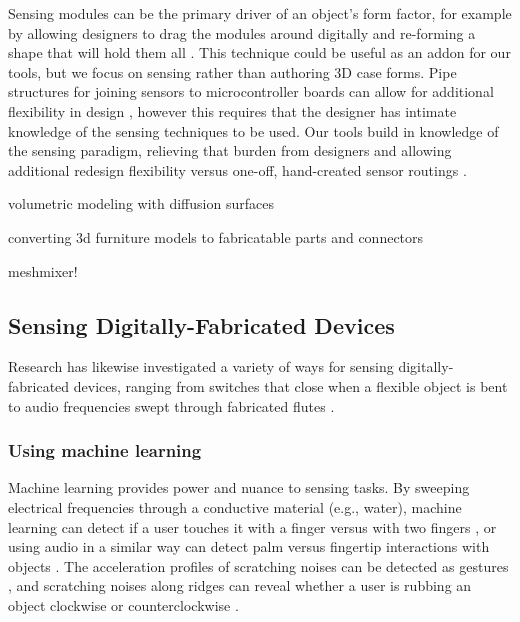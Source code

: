     Sensing modules can be the primary driver of an object's form factor, for example by allowing designers to drag the modules around digitally and re-forming a shape that will hold them all \cite{weichel-mixfab}. This technique could be useful as an addon for our tools, but we focus on sensing rather than authoring 3D case forms. Pipe structures for joining sensors to microcontroller boards can allow for additional flexibility in design \cite{savage-sot}, however this requires that the designer has intimate knowledge of the sensing techniques to be used. Our tools build in knowledge of the sensing paradigm, relieving that burden from designers and allowing additional redesign flexibility versus one-off, hand-created sensor routings \cite{navarrette-gps, park-microchannels}.
    
    \cite{takayama-volumetric} volumetric modeling with diffusion surfaces
    
    \cite{lau-converting} converting 3d furniture models to fabricatable parts and connectors
    
    \cite{schmidt-meshmixer} meshmixer!

\subsection{Sensing Digitally-Fabricated Devices}

    Research has likewise investigated a variety of ways for sensing digitally-fabricated devices, ranging from switches that close when a flexible object is bent \cite{slyper-structure} to audio frequencies swept through fabricated flutes \cite{laput-acoustruments}.

    \subsubsection{Using machine learning}
        Machine learning provides power and nuance to sensing tasks. By sweeping electrical frequencies through a conductive material (e.g., water), machine learning can detect if a user touches it with a finger versus with two fingers \cite{sato-touche}, or using audio in a similar way can detect palm versus fingertip interactions with objects \cite{ono-touchandactivate}. The acceleration profiles of scratching noises can be detected as gestures \cite{harrison-scratchinput}, and scratching noises along ridges can reveal whether a user is rubbing an object clockwise or counterclockwise \cite{murray-smith-stane}.
        
